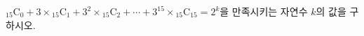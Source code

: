 ${}_{15}\mathrm{C}_0+3\times{}_{15}\mathrm{C}_1+3^2\times{}_{15}\mathrm{C}_2+\cdots+3^{15}\times{}_{15}\mathrm{C}_{15}=2^k$을 만족시키는 자연수 $k$의 값을 구하시오.
